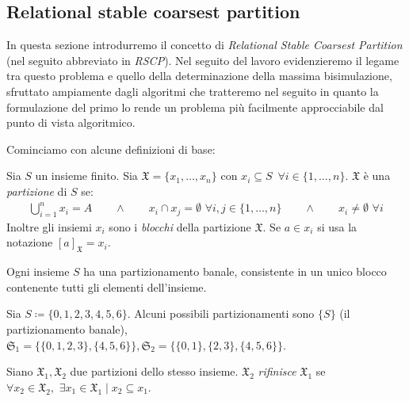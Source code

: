 \subsection{Relational stable coarsest partition}
\label{sec:rscp}
In questa sezione introdurremo il concetto di \emph{Relational Stable Coarsest Partition} (nel seguito abbreviato in \emph{RSCP}). Nel seguito del lavoro evidenzieremo il legame tra questo problema e quello della determinazione della massima bisimulazione, sfruttato ampiamente dagli algoritmi che tratteremo nel seguito in quanto la formulazione del primo lo rende un problema più facilmente approcciabile dal punto di vista algoritmico.

Cominciamo con alcune definizioni di base:
\begin{definition}
    Sia $S$ un insieme finito. Sia $\mathfrak{X} = \{x_1, \dots, x_n\}$ con $x_i \subseteq S \,\,\,\forall i \in \{1,\dots,n\}$. $\mathfrak{X}$ è una \emph{partizione} di $S$ se:
    \begin{gather*}
        \bigcup_{i = 1}^n x_i = A \qquad \land \qquad x_i \cap x_j = \emptyset \,\,\forall i,j \in \{1,\dots,n\} \qquad \land \qquad x_i \neq \emptyset \,\,\forall i
    \end{gather*}
    Inoltre gli insiemi $x_i$ sono i \emph{blocchi} della partizione $\mathfrak{X}$. Se $a \in x_i$ si usa la notazione $[a]_{\mathfrak{X}} = x_i$.
\end{definition}

\begin{observation}
    \label{obs:part_banale}
    Ogni insieme $S$ ha una partizionamento banale, consistente in un unico blocco contenente tutti gli elementi dell'insieme.
\end{observation}

\begin{example}
    Sia $S \coloneqq \{0,1,2,3,4,5,6\}$. Alcuni possibili partizionamenti sono $\{S\}$ (il partizionamento banale), $\mathfrak{S}_1 = \{\{0,1,2,3\},\{4,5,6\}\}, \mathfrak{S}_2 = \{\{0,1\},\{2,3\},\{4,5,6\}\}$.
    \label{exa:set_partition}
\end{example}

\begin{definition}
    Siano $\mathfrak{X}_1,\mathfrak{X}_2$ due partizioni dello stesso insieme. $\mathfrak{X}_2$ \emph{rifinisce} $\mathfrak{X}_1$ se $\forall x_2 \in \mathfrak{X}_2, \,\,\exists x_1 \in \mathfrak{X}_1 \mid x_2 \subseteq x_1$.
\end{definition}

